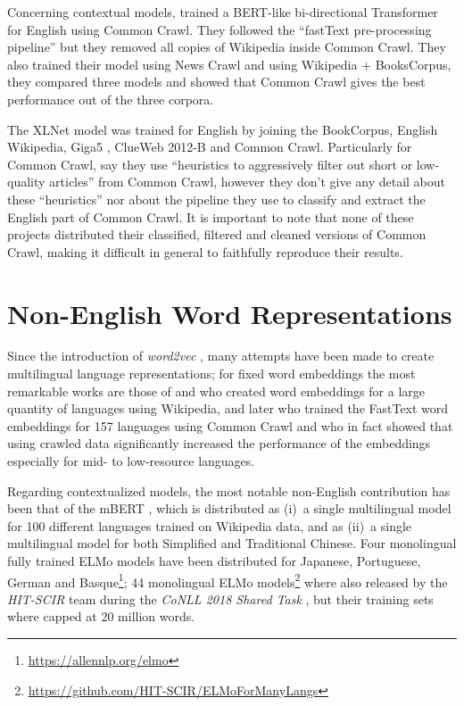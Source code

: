 Concerning contextual models, \citet{baevski-etal-2019-cloze} trained a BERT-like bi-directional Transformer for English using Common Crawl. They followed the ``fastText pre-processing pipeline'' but they removed all copies of Wikipedia inside Common Crawl. They also trained their model using News Crawl \citep{bojar-etal-2018-findings} and using Wikipedia + BooksCorpus, they compared three models and showed that Common Crawl gives the best performance out of the three corpora.

The XLNet model was trained for English by joining the BookCorpus, English Wikipedia, Giga5 \citep{parker-etal-2011-english}, ClueWeb 2012-B \citep{callan-etal-2009-clueweb09} and Common Crawl. Particularly for Common Crawl, \citet{yang-etal-2019-xlnet} say they use ``heuristics to aggressively filter out short or low-quality articles'' from Common Crawl, however they don't give any detail about these ``heuristics'' nor about the pipeline they use to classify and extract the English part of Common Crawl. It is important to note that none of these projects distributed their classified, filtered and cleaned versions of Common Crawl, making it difficult in general to faithfully reproduce their results.

\section{Non-English Word Representations}

Since the introduction of \emph{word2vec} \citep{mikolov-etal-2013-distributed}, many attempts have been made to create multilingual language representations; for fixed word embeddings the most remarkable works are those of \citep{al-rfou-etal-2013-polyglot} and \citep{bojanowski-etal-2017-enriching} who created word embeddings for a large quantity of languages using Wikipedia, and later \citep{grave-etal-2018-learning} who trained the FastText word embeddings for 157 languages using Common Crawl and who in fact showed that using crawled data significantly increased the performance of the embeddings especially for mid- to low-resource languages.

Regarding contextualized models, the most notable non-English contribution has been that of the mBERT \citep{devlin-etal-2019-bert}, which is distributed as (i)~a single multilingual model for 100 different languages trained on Wikipedia data, and as (ii)~a single multilingual model for both Simplified and Traditional Chinese. Four monolingual fully trained ELMo models have been distributed for Japanese, Portuguese, German and Basque\footnote{\url{https://allennlp.org/elmo}}; 44 monolingual ELMo models\footnote{\url{https://github.com/HIT-SCIR/ELMoForManyLangs}} where also released by the \emph{HIT-SCIR} team \citep{che-etal-2018-towards} during the \emph{CoNLL 2018 Shared Task} \citep{zeman-etal-2018-conll}, but their training sets where capped at 20 million words.

